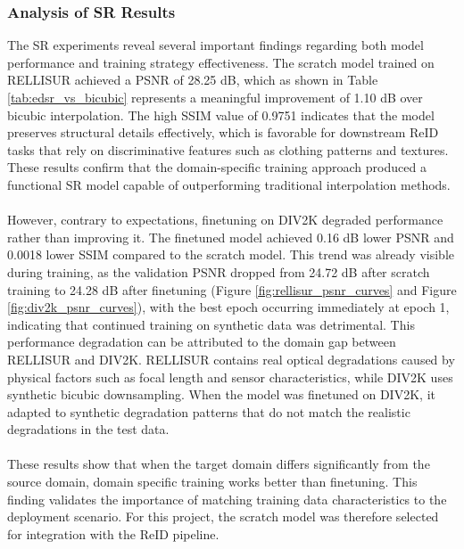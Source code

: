 \subsubsection{Analysis of SR Results}
The \acs{SR} experiments reveal several important findings regarding both model performance and training strategy effectiveness. The scratch model trained on \acs{RELLISUR} achieved a \acs{PSNR} of 28.25 dB, which as shown in Table \ref{tab:edsr_vs_bicubic} represents a meaningful improvement of 1.10 dB over bicubic interpolation. The high \acs{SSIM} value of 0.9751 indicates that the model preserves structural details effectively, which is favorable for downstream \acs{ReID} tasks that rely on discriminative features such as clothing patterns and textures. These results confirm that the domain-specific training approach produced a functional \acs{SR} model capable of outperforming traditional interpolation methods.
\\\\
However, contrary to expectations, finetuning on \acs{DIV2K} degraded performance rather than improving it. The finetuned model achieved 0.16 dB lower \acs{PSNR} and 0.0018 lower \acs{SSIM} compared to the scratch model. This trend was already visible during training, as the validation \acs{PSNR} dropped from 24.72 dB after scratch training to 24.28 dB after finetuning (Figure \ref{fig:rellisur_psnr_curves} and Figure \ref{fig:div2k_psnr_curves}), with the best epoch occurring immediately at epoch 1, indicating that continued training on synthetic data was detrimental. This performance degradation can be attributed to the domain gap between \acs{RELLISUR} and \acs{DIV2K}. \acs{RELLISUR} contains real optical degradations caused by physical factors such as focal length and sensor characteristics, while \acs{DIV2K} uses synthetic bicubic downsampling. When the model was finetuned on \acs{DIV2K}, it adapted to synthetic degradation patterns that do not match the realistic degradations in the test data. 
\\\\
These results show that when the target domain differs significantly from the source domain, domain specific training works better than finetuning. This finding validates the importance of matching training data characteristics to the deployment scenario. For this project, the scratch model was therefore selected for integration with the \acs{ReID} pipeline.


